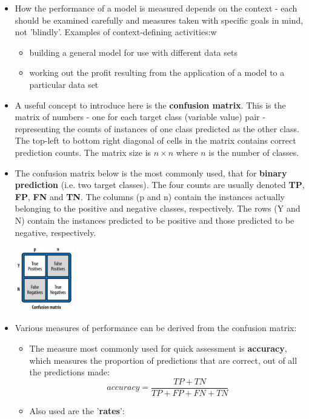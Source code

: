 \begin{itemize}
\item How the performance of a model is measured depends on the context - each should be examined carefully and measures taken with specific goals in mind, not 'blindly'. Examples of context-defining activities:w
  \begin{itemize}
  \item building a general model for use with different data sets
  \item working out the profit resulting from the application of a model to a particular data set
  \end{itemize}
\item A useful concept to introduce here is the \textbf{confusion matrix}. This is the matrix of numbers - one for each target class (variable value) pair - representing the counts of instances of one class predicted as the other class. The top-left to bottom right diagonal of cells in the matrix contains correct prediction counts. The matrix size is $n \times n$ where $n$ is the number of classes.
  \newpage
  \item The confusion matrix below is the most commonly used, that for \textbf{binary prediction} (i.e. two target classes). The four counts are usually denoted \textbf{TP}, \textbf{FP}, \textbf{FN} and \textbf{TN}. The columns (p and n) contain the instances actually belonging to the positive and negative classes, respectively. The rows (Y and N) contain the instances predicted to be positive and those predicted to be negative, respectively.
    \begin{center}\includegraphics[width=0.2\textwidth]{7-2_confusion_matrix.png}\end{center}
  \item Various measures of performance can be derived from the confusion matrix:
    \begin{itemize}
    \item The measure most commonly used for quick assessment is \textbf{accuracy}, which measures the proportion of predictions that are correct, out of all the predictions made:
      $$ accuracy = \dfrac{TP+TN}{TP+FP+FN+TN}$$
      \newpage
    \item Also used are the '\textbf{rates}':

\end{itemize}
\end{itemize}
